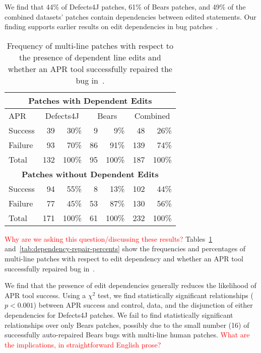 \documentclass[sigconf, timestamp-false, anonymous=true]{acmart}
\newcommand\todo[1]{\textcolor{red}{#1}}
\begin{document}
We find that 44\% of Defects4J patches, 61\% of Bears patches, 
and 49\% of the combined datasets' patches contain dependencies 
between edited statements.
Our finding supports earlier results on edit dependencies in 
bug patches~\cite{zhong2015}. 


\begin{table}
{\begin{center}
	\begin{tabular}{l | rr | rr | rr}
		\toprule
		\multicolumn{7}{c}{\textbf{Patches with Dependent Edits}} \\
		\midrule
		APR & \multicolumn{2}{c}{Defects4J} & \multicolumn{2}{c}{Bears} & \multicolumn{2}{c}{Combined} \\
		\midrule
		Success & 39 & 30\% & 9 & 9\% & 48 & 26\% \\
		Failure & 93 & 70\% & 86 & 91\% & 139 & 74\% \\
		\midrule
		Total & 132 & 100\% & 95 & 100\% & 187 & 100\% \\
		\midrule
		\multicolumn{7}{c}{\textbf{Patches without Dependent Edits}} \\
		\midrule
		Success & 94 & 55\% & 8 & 13\% & 102 & 44\% \\
		Failure & 77 & 45\% & 53 & 87\% & 130 & 56\% \\
		\midrule
		Total & 171 & 100\% & 61 & 100\% & 232 & 100\% \\
		\bottomrule
	\end{tabular}
 \end{center}
}
	\caption{Frequency of multi-line patches with respect to the presence of 
	dependent line edits and whether an APR tool successfully 
	repaired the bug in~\cite{durieux-repair-them-all}.}
	\label{tab:dependency-repair-contingency-table}
\end{table}

\todo{Why are we asking this question/discussing these results?} 
Tables~\ref{tab:dependency-repair-contingency-table} and~\ref{tab:dependency-repair-percents}
show the frequencies and percentages of multi-line patches with respect to edit dependency 
and whether an APR tool successfully repaired bug in~\cite{durieux-repair-them-all}.

We find that the presence of edit dependencies generally reduces the likelihood of APR tool success.
Using a $\chi^2$ test, we find statistically significant relationships ($p < 0.001$)
between APR success and control, data, and the disjunction of either dependencies 
for Defects4J patches. We fail to find statistically 
significant relationships over only Bears patches, possibly due to the small number (16) of 
successfully auto-repaired Bears bugs with multi-line human patches.
\todo{What are the implications, in straightforward English prose?}
\end{document}

